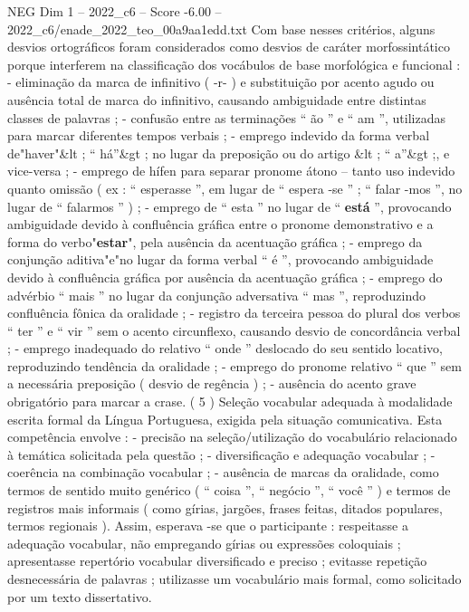 \begin{textsample}{NEG Dim 1 – 2022\_c6 – Score -6.00 – 2022\_c6/enade\_2022\_teo\_00a9aa1edd.txt}
Com base nesses critérios, alguns desvios ortográficos foram considerados como desvios de caráter morfossintático porque interferem na classificação dos vocábulos de base morfológica e funcional : - eliminação da marca de infinitivo ( -r- ) e substituição por acento agudo ou ausência total de marca do infinitivo, causando ambiguidade entre distintas classes de palavras ; - confusão entre as terminações “ ão ” e “ am ”, utilizadas para marcar diferentes tempos verbais ; - emprego indevido da forma verbal de"haver"\&lt ; “ há”\&gt ; no lugar da preposição ou do artigo \&lt ; “ a”\&gt ;, e vice-versa ; - emprego de hífen para separar pronome átono – tanto uso indevido quanto omissão ( ex : “ esperasse ”, em lugar de “ espera -se ” ; “ falar -mos ”, no lugar de “ falarmos ” ) ; - emprego de “ esta ” no lugar de “ \textbf{está} ”, provocando ambiguidade devido à confluência gráfica entre o pronome demonstrativo e a forma do verbo"\textbf{estar}", pela ausência da acentuação gráfica ; - emprego da conjunção aditiva"e"no lugar da forma verbal “ é ”, provocando ambiguidade devido à confluência gráfica por ausência da acentuação gráfica ; - emprego do advérbio “ mais ” no lugar da conjunção adversativa “ mas ”, reproduzindo confluência fônica da oralidade ; - registro da terceira pessoa do plural dos verbos “ ter ” e “ vir ” sem o acento circunflexo, causando desvio de concordância verbal ; - emprego inadequado do relativo “ onde ” deslocado do seu sentido locativo, reproduzindo tendência da oralidade ; - emprego do pronome relativo “ que ” sem a necessária preposição ( desvio de regência ) ; - ausência do acento grave obrigatório para marcar a crase. ( 5 ) Seleção vocabular adequada à modalidade escrita formal da Língua Portuguesa, exigida pela situação comunicativa.
Esta competência envolve : - precisão na seleção/utilização do vocabulário relacionado à temática solicitada pela questão ; - diversificação e adequação vocabular ; - coerência na combinação vocabular ; - ausência de marcas da oralidade, como termos de sentido muito genérico ( “ coisa ”, “ negócio ”, “ você ” ) e termos de registros mais informais ( como gírias, jargões, frases feitas, ditados populares, termos regionais ).
Assim, esperava -se que o participante : respeitasse a adequação vocabular, não empregando gírias ou expressões coloquiais ; apresentasse repertório vocabular diversificado e preciso ; evitasse repetição desnecessária de palavras ; utilizasse um vocabulário mais formal, como solicitado por um texto dissertativo.

\end{textsample}

